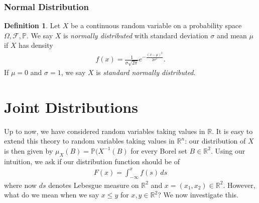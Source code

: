 \documentclass[12pt]{article}
\newcommand{\rr}{\mathbb{R}}
\newcommand{\filter}{\mathcal{F}}
\newcommand{\prob}{\mathbb{P}}
\theoremstyle{plain}
\theoremstyle{definition}
\newtheorem*{definition}{Definition}
\theoremstyle{remark}
\numberwithin{equation}{section}  %
\begin{document}
\subsubsection{Normal Distribution}
\begin{definition}
Let $X$ be a continuous random variable on a probability space $\Omega, \filter,
\prob$. We say $X$ is \emph{normally distributed} with standard deviation $\sigma$ and
mean $\mu$ if $X$ has density
\begin{align*}
f(x) = \frac{1}{\sigma \sqrt{2 \pi}} e^{ -\frac{(x - \mu)^2}{2 \sigma^2}}.
\end{align*}
If $\mu = 0$ and $\sigma =1$, we say $X$ is \emph{standard normally
distributed}.
\end{definition}
\section{Joint Distributions}
Up to now, we have considered random variables taking values in $\rr$.
It is easy to extend this theory to random variables taking values in $\rr^n$:
our distribution of $X$ is then given by $\mu_X(B) =
\prob(X^{-1}(B)$ for every Borel set $B \in
\rr^2$. Using our intuition, we ask if our distribution function should be of
\begin{align*}
F(x) = \int_{-\infty}^{x} f(s) \, ds
\end{align*}
where now $ds$ denotes Lebesgue measure on $\rr^2$ and $x = (x_1, x_2) \in
\rr^2$. However, what do we mean when we say $x \le y$ for $x, y \in \rr^2$? 
We now investigate this.
\end{document}
